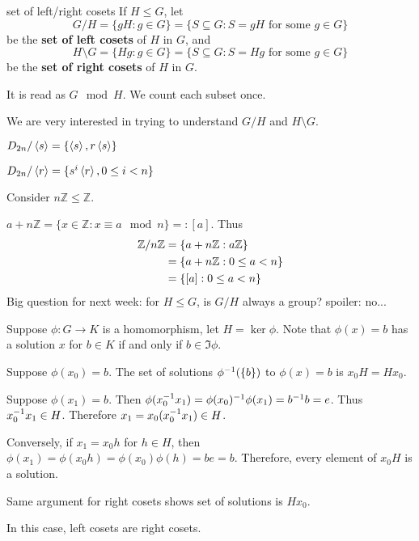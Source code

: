 \begin{defn}{set of left/right cosets}
If $H\le G$, let 
$$G/H=\{gH:g\in G\}=\{S\subseteq G:S=gH \text{ for some }g\in G\}$$
be the \textbf{set of left cosets} of $H$ in $G$, and 
$$H\setminus G = \{Hg:g\in G\}=\{S\subseteq G:S=Hg\text{ for some } g\in G\}$$
be the \textbf{set of right cosets} of $H$ in $G$.
\end{defn}
\begin{remark}
It is read as $G \mod H$. We count each subset once.

We  are very interested in trying to understand $G/H$ and $H\setminus G$.
\end{remark}

\begin{ex}[$D_{2n}$]
$D_{2n}/\left\langle s \right\rangle = \{\left\langle s \right\rangle,r\left\langle s \right\rangle\}$

$D_{2n}/\left\langle r \right\rangle = \{s^i\left\langle r \right\rangle, 0\le i < n\}$
\end{ex}


\begin{ex}[$\znz$]
Consider $n\mathbb Z\le \mathbb Z$.

$a+n\mathbb Z=\{x\in \mathbb Z:x\equiv a \mod n\}=:[a]$. Thus
$$
\begin{aligned}
\mathbb Z/n\mathbb Z &= \{a+n\mathbb Z:a\mathbb Z\}\\
&= \{a+n\mathbb Z:0\le a < n\}\\
&= \{[a]:0\le a < n\}
\end{aligned}
$$
Big question for next week: for $H\le G$, is $G/H$ always a group? spoiler: no...
\end{ex}

Suppose $\phi:G\to K$ is a homomorphism, let $H=\ker\phi$. Note that $\phi(x)=b$ has a solution $x$ for $b\in K$ if and only if $b\in\Im \phi$.

\begin{lemma}
Suppose $\phi(x_0)=b$. The set of solutions $\phi^{-1}(\{b\})$ to $\phi(x)=b$ is $x_0H=Hx_0$.
\end{lemma}

\begin{pf}
Suppose $\phi(x_1)=b$. Then $\phi(x_0^{-1} x_1)=\phi(x_0)^{-1} \phi(x_1)=b^{-1} b=e$. Thus $x_0^{-1} x_1\in H$. Therefore $x_1=x_0(x_0^{-1} x_1)\in H$.

Conversely, if $x_1=x_0h$ for $h\in H$, then $\phi(x_1)=\phi(x_0h)=\phi(x_0)\phi(h)=be = b$. Therefore, every element of $x_0H$ is a solution.

Same argument for right cosets shows set of solutions is $Hx_0$.
\end{pf}
In this case, left cosets are right cosets.

